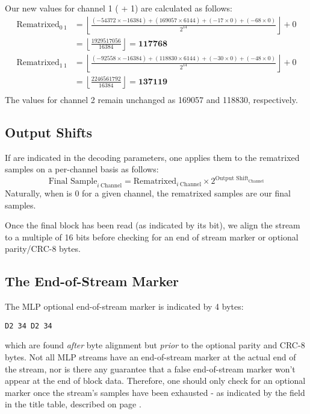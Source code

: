 \par
\noindent
Our new values for channel 1 ( + 1) are calculated as follows:
\begin{align*}
\text{Rematrixed}_{0~1} &= \left\lfloor\frac{(-54372 \times -16384) + (169057 \times 6144) + (-17 \times 0) + (-68 \times 0)}{2 ^ {14}}\right\rfloor + 0 \\
&= \left\lfloor\frac{1929517056}{16384}\right\rfloor = \textbf{117768} \\
\text{Rematrixed}_{1~1} &= \left\lfloor\frac{(-92558 \times -16384) + (118830 \times 6144) + (-30 \times 0) + (-48 \times 0)}{2 ^ {14}}\right\rfloor + 0 \\
&= \left\lfloor\frac{2246561792}{16384}\right\rfloor = \textbf{137119} \\
\end{align*}
The values for channel 2 remain unchanged as 169057 and 118830, respectively.

\subsection{Output Shifts}

If  are indicated in the decoding parameters,
one applies them to the rematrixed samples on a per-channel
basis as follows:
\begin{equation*}
\text{Final Sample}_{i~\text{Channel}} = \text{Rematrixed}_{i~\text{Channel}} \times 2 ^ {\text{Output Shift}_\text{Channel}}
\end{equation*}
Naturally, when  is 0 for a given channel,
the rematrixed samples are our final samples.

Once the final block has been read (as indicated by its  bit),
we align the stream to a multiple of 16 bits before checking
for an end of stream marker or optional parity/CRC-8 bytes.

\subsection{The End-of-Stream Marker}

The MLP optional end-of-stream marker is indicated by 4 bytes:

\begin{Verbatim}
D2 34 D2 34
\end{Verbatim}
\par
\noindent
which are found \textit{after} byte alignment
but \textit{prior} to the optional parity and CRC-8 bytes.
Not all MLP streams have an end-of-stream marker at the actual
end of the stream, nor is there any guarantee that
a false end-of-stream marker won't appear at the end of
block data.
Therefore, one should only check for an optional marker
once the stream's samples have been exhausted - as indicated
by the  field in the title table,
described on page \pageref{dvda_title_table}.

